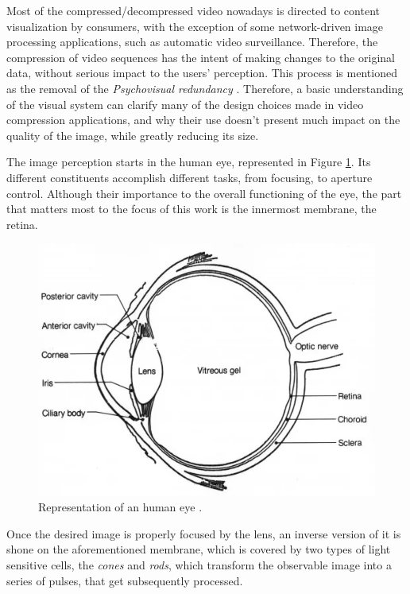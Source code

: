 \nocite{gonzalezDigitalImageProcessing2018}

Most of the compressed/decompressed video nowadays is directed to content visualization by consumers, with the exception of some network-driven image processing applications, such as automatic video surveillance. Therefore, the compression of video sequences has the intent of making changes to the original data, without serious impact to the users' perception. This process is mentioned as the removal of the \emph{Psychovisual redundancy} \cite{shiImageVideoCompression2008}. Therefore, a basic understanding of the visual system can clarify many of the design choices made in video compression applications, and why their use doesn't present much impact on the quality of the image, while greatly reducing its size.

The image perception starts in the human eye, represented in Figure \ref{fig:eye}. Its different constituents accomplish different tasks, from focusing, to aperture control. Although their importance to the overall functioning of the eye, the part that matters most to the focus of this work is the innermost membrane, the retina.

\begin{figure}[h]
    \centering
    \includegraphics[width=\figwidth]{Sections/2AV1/Diagrams/eyediagram.png}
    \caption[Representation of an human eye]{Representation of an human eye \cite{owlcationAnatomyEyeHuman}.}
    \label{fig:eye}
\end{figure}

Once the desired image is properly focused by the lens, an inverse version of it is shone on the aforementioned membrane, which is covered by two types of light sensitive cells, the \emph{cones} and \emph{rods}, which transform the observable image into a series of pulses, that get subsequently processed.


